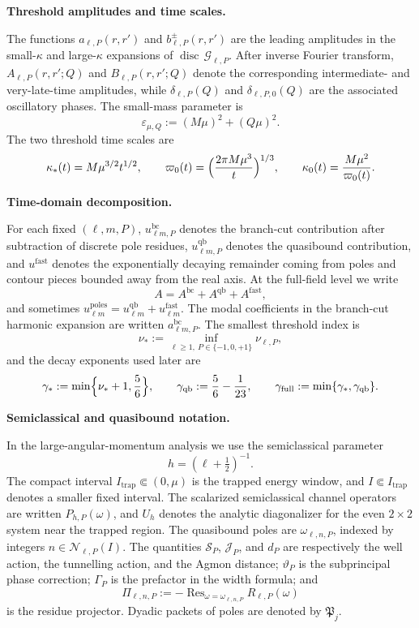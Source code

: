 \documentclass[12pt]{article}
\numberwithin{equation}{section}
\theoremstyle{plain}
\theoremstyle{definition}
\theoremstyle{remark}
\newcommand{\disc}{\operatorname{disc}}
\newcommand{\Res}{\operatorname{Res}}
\newcommand{\bc}{\mathrm{bc}}
\newcommand{\qb}{\mathrm{qb}}
\newcommand{\fast}{\mathrm{fast}}
\newcommand{\cG}{\mathcal G}
\newcommand{\vp}{\varpi}
\newcommand{\kap}{\kappa}
\newcommand{\eps}{\varepsilon}
\begin{document}
\medskip\noindent\textbf{Threshold amplitudes and time scales.}\par\smallskip\noindent
The functions $a_{\ell,P}(r,r')$ and $b_{\ell,P}^\pm(r,r')$ are the leading amplitudes in the small-$\kap$ and large-$\kap$ expansions of $\disc\,\cG_{\ell,P}$.  After inverse Fourier transform, $A_{\ell,P}(r,r';Q)$ and $B_{\ell,P}(r,r';Q)$ denote the corresponding intermediate- and very-late-time amplitudes, while $\delta_{\ell,P}(Q)$ and $\delta_{\ell,P,0}(Q)$ are the associated oscillatory phases.  The small-mass parameter is
\[
   \eps_{\mu,Q}:=(M\mu)^2+(Q\mu)^2.
\]
The two threshold time scales are
\[
   \kap_*(t)=M\mu^{3/2}t^{1/2},
   \qquad
   \vp_0(t)=\Bigl(\frac{2\pi M\mu^3}{t}\Bigr)^{1/3},
   \qquad
   \kap_0(t)=\frac{M\mu^2}{\vp_0(t)}.
\]

\medskip\noindent\textbf{Time-domain decomposition.}\par\smallskip\noindent
For each fixed $(\ell,m,P)$, $u_{\ell m,P}^{\bc}$ denotes the branch-cut contribution after subtraction of discrete pole residues, $u_{\ell m,P}^{\qb}$ denotes the quasibound contribution, and $u^{\fast}$ denotes the exponentially decaying remainder coming from poles and contour pieces bounded away from the real axis.  At the full-field level we write
\[
   A=A^{\bc}+A^{\qb}+A^{\fast},
\]
and sometimes $u_{\ell m}^{\mathrm{poles}}=u_{\ell m}^{\qb}+u_{\ell m}^{\fast}$.  The modal coefficients in the branch-cut harmonic expansion are written $a_{\ell m,P}^{\bc}$.  The smallest threshold index is
\[
   \nu_*:=\inf_{\ell\ge1,\ P\in\{-1,0,+1\}}\nu_{\ell,P},
\]
and the decay exponents used later are
\[
   \gamma_*:=\min\Bigl\{\nu_*+1,\frac56\Bigr\},
   \qquad
   \gamma_{\mathrm{qb}}:=\frac56-\frac1{23},
   \qquad
   \gamma_{\mathrm{full}}:=\min\{\gamma_*,\gamma_{\mathrm{qb}}\}.
\]

\medskip\noindent\textbf{Semiclassical and quasibound notation.}\par\smallskip\noindent
In the large-angular-momentum analysis we use the semiclassical parameter
\[
   h=(\ell+\tfrac12)^{-1}.
\]
The compact interval $I_{\mathrm{trap}}\Subset(0,\mu)$ is the trapped energy window, and $I\Subset I_{\mathrm{trap}}$ denotes a smaller fixed interval.  The scalarized semiclassical channel operators are written $P_{h,P}(\omega)$, and $U_h$ denotes the analytic diagonalizer for the even $2\times2$ system near the trapped region.  The quasibound poles are $\omega_{\ell,n,P}$, indexed by integers $n\in\mathcal N_{\ell,P}(I)$.  The quantities $\mathscr S_P$, $\mathscr J_P$, and $d_P$ are respectively the well action, the tunnelling action, and the Agmon distance; $\vartheta_P$ is the subprincipal phase correction; $\Gamma_P$ is the prefactor in the width formula; and
\[
   \Pi_{\ell,n,P}:=-\Res_{\omega=\omega_{\ell,n,P}}R_{\ell,P}(\omega)
\]
is the residue projector.  Dyadic packets of poles are denoted by $\mathfrak P_j$.
\end{document}
